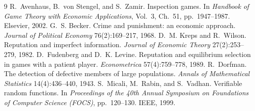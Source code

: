 \documentclass[11pt,a4paper]{article}
\begin{document}
\begin{thebibliography}{9}
 R.~Avenhaus, B.~von Stengel, and S.~Zamir. Inspection games. In \emph{Handbook of Game Theory with Economic Applications}, Vol.~3, Ch.~51, pp.~1947--1987. Elsevier, 2002.
 G.~S. Becker. Crime and punishment: an economic approach. \emph{Journal of Political Economy} 76(2):169--217, 1968.
 D.~M. Kreps and R.~Wilson. Reputation and imperfect information. \emph{Journal of Economic Theory} 27(2):253--279, 1982.
 D.~Fudenberg and D.~K. Levine. Reputation and equilibrium selection in games with a patient player. \emph{Econometrica} 57(4):759--778, 1989.
 R.~Dorfman. The detection of defective members of large populations. \emph{Annals of Mathematical Statistics} 14(4):436--440, 1943.
 S.~Micali, M.~Rabin, and S.~Vadhan. Verifiable random functions. In \emph{Proceedings of the 40th Annual Symposium on Foundations of Computer Science (FOCS)}, pp.~120--130. IEEE, 1999.
\end{thebibliography}
\end{document}
